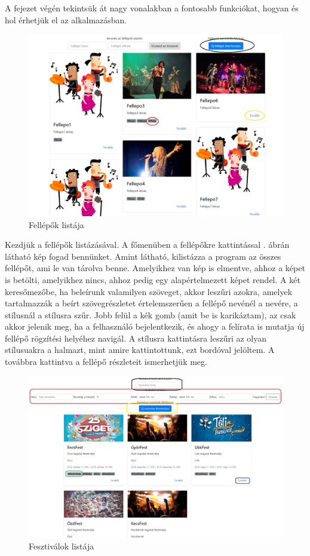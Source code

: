 
A fejezet végén tekintsük át nagy vonalakban a fontosabb funkciókat, hogyan és hol érhetjük el az alkalmazásban. 

\begin{figure}[h!]
\centering
\includegraphics[scale=0.45]{kepek/artistList.jpg}
\caption{Fellépők listája}
\label{fig:artistList}
\end{figure}

Kezdjük a fellépők listázásával. A főmenüben a fellépőkre kattintással . ábrán látható kép fogad bennünket. Amint látható, kilistázza a program az összes fellépőt, ami le van tárolva benne. Amelyikhez van kép is elmentve, ahhoz a képet is betölti, amelyikhez nincs, ahhoz pedig egy alapértelmezett képet rendel. A  két keresőmezőbe, ha beleírunk valamilyen szöveget, akkor leszűri azokra, amelyek tartalmazzák a beírt szövegrészletet értelemszerűen a fellépő nevénél a nevére, a stílusnál a stílusra szűr. Jobb felül a kék gomb (amit be is karikáztam), az csak akkor jelenik meg, ha a felhasználó bejelentkezik, és ahogy a felírata is mutatja új fellépő rögzítési helyéhez navigál. A stílusra kattintásra leszűri az olyan stílusuakra a halmazt, mint amire kattintottunk, ezt bordóval jelöltem. A továbbra kattintva a  fellépő részleteit ismerhetjük meg.

\begin{figure}[h!]
\centering
\includegraphics[scale=0.45]{kepek/festList.jpg}
\caption{Fesztiválok listája}
\label{fig:festList}
\end{figure}

